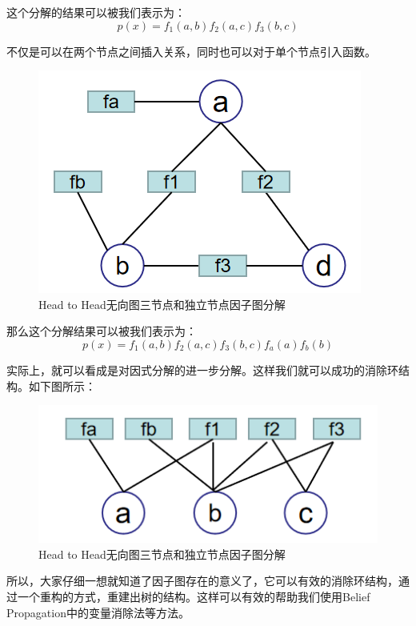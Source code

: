 \documentclass[a4paper]{article}
\begin{document}
这个分解的结果可以被我们表示为：
\begin{equation}
    p(x) = f_1(a,b)f_2(a,c)f_3(b,c)
\end{equation}

不仅是可以在两个节点之间插入关系，同时也可以对于单个节点引入函数。
\begin{figure}[H]
    \centering
    \includegraphics[width=.35\textwidth]{微信图片_20191212094923.png}
    \caption{Head to Head无向图三节点和独立节点因子图分解}
    
\end{figure}

那么这个分解结果可以被我们表示为：
\begin{equation}
    p(x) = f_1(a,b)f_2(a,c)f_3(b,c)f_a(a)f_b(b)
\end{equation}

实际上，就可以看成是对因式分解的进一步分解。这样我们就可以成功的消除环结构。如下图所示：
\begin{figure}[H]
    \centering
    \includegraphics[width=.35\textwidth]{微信图片_20191212100021.png}
    \caption{Head to Head无向图三节点和独立节点因子图分解}
    
\end{figure}

所以，大家仔细一想就知道了因子图存在的意义了，它可以有效的消除环结构，通过一个重构的方式，重建出树的结构。这样可以有效的帮助我们使用Belief Propagation中的变量消除法等方法。
\end{document}
